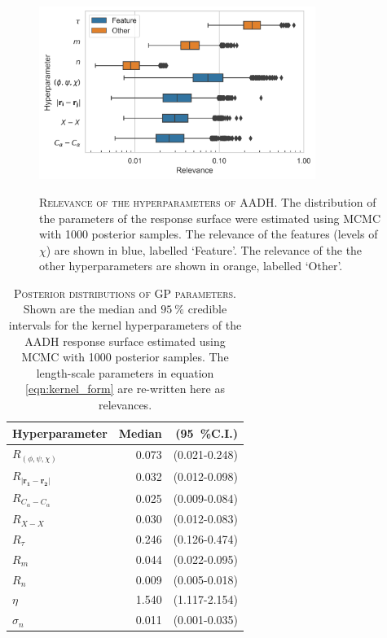 \begin{figure}
    \centering
    \caption[Relevance of the hyperparameters of AADH]{\textsc{Relevance of the hyperparameters of AADH}. The distribution of the parameters of the response surface were estimated using MCMC with \num{1000} posterior samples. The relevance of the features (levels of $\chi$) are shown in blue, labelled `Feature'. The relevance of the the other hyperparameters are shown in orange, labelled `Other'.}
    \includegraphics[width=0.8\textwidth]{chapters/msm_optimization/figures/AADH_relevance_d.png}
    \label{fig:aadh_relevance}
\end{figure}

\begin{table}
    \centering
    \caption[Posterior distributions of GP parameters]{\textsc{Posterior distributions of GP parameters}. Shown are the median and $\SI{95}{\percent}$ credible intervals for the kernel hyperparameters of the AADH response surface estimated using MCMC with \num{1000} posterior samples. The length-scale parameters in equation \ref{eqn:kernel_form} are re-written here as relevances.}
    \begin{tabular}{lrr}
    \toprule
                             Hyperparameter &  Median &     (\SI{95}{\percent}C.I.) \\
    \midrule
                    $R_{(\phi, \psi, \chi)}$ &   0.073 &  (0.021-0.248) \\
     $R_{|\mathbf{r_{1}} - \mathbf{r_{2}}|}$ &   0.032 &  (0.012-0.098) \\
                 $R_{C_{\alpha}-C_{\alpha}}$ &   0.025 &  (0.009-0.084) \\
                                  $R_{X-X}$ &   0.030 &  (0.012-0.083) \\
                                  $R_{\tau}$ &   0.246 &  (0.126-0.474) \\
                                     $R_{m}$ &   0.044 &  (0.022-0.095) \\
                                     $R_{n}$ &   0.009 &  (0.005-0.018) \\
                                      $\eta$ &   1.540 &  (1.117-2.154) \\
                                  $\sigma_n$ &   0.011 &  (0.001-0.035) \\
    \bottomrule
    \end{tabular}
    \label{tab:aadh_rel}
\end{table}


